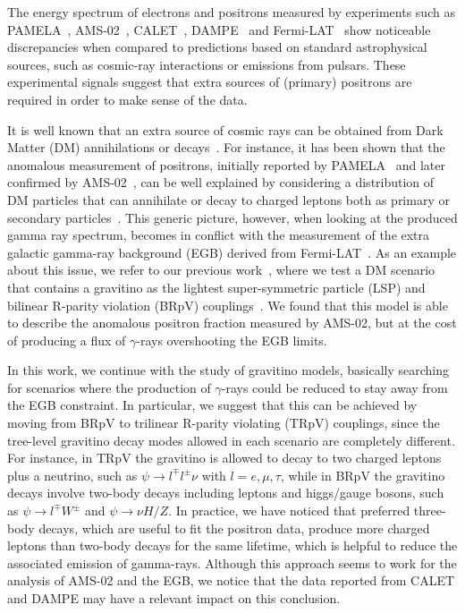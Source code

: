 \documentclass[a4paper,11pt]{article}
\begin{document}
The energy spectrum of electrons and positrons measured by experiments such as PAMELA~\cite{Adriani:2008zr}, AMS-02~\cite{Accardo:2014lma,Aguilar:2014mma,Aguilar:2014fea}, CALET~\cite{Adriani:2018ktz}, DAMPE~\cite{Ambrosi:2017wek} and Fermi-LAT~\cite{Ackermann:2014usa} show noticeable discrepancies when compared to predictions based on standard astrophysical sources, such as cosmic-ray interactions or emissions from pulsars. These experimental signals suggest that extra sources of (primary) positrons are required in order to make sense of the data. 

It is well known that an extra source  of cosmic rays can be obtained from Dark Matter (DM) annihilations or decays~\cite{Hooper:2018kfv}. For instance, it has been shown that the anomalous measurement of positrons, initially reported by PAMELA~\cite{Adriani:2008zr} and later confirmed by AMS-02~\cite{Accardo:2014lma}, can be well explained by considering a distribution of DM particles that can annihilate or decay to charged leptons both as primary or secondary particles~\cite{Grefe:2008zz,2012PhRvD..86h3506C,Ando:2015qda,Laletin:2016egv,Liu:2016ngs,Belotsky:2016tja}. This generic picture, however, when looking at the produced gamma ray spectrum, becomes in conflict with the measurement of the extra galactic gamma-ray background (EGB) derived from Fermi-LAT~\cite{Ackermann:2014usa}. As an example about this issue, we refer to our previous work~\cite{Carquin:2015uma}, where we test a DM scenario that contains a gravitino as the lightest super-symmetric particle (LSP) and bilinear R-parity violation (BRpV) couplings~\cite{Grefe:2011dp}. We found that this model is able to describe the anomalous positron fraction measured by AMS-02, but at the cost of producing a flux of $\gamma$-rays overshooting the EGB limits. 

In this work, we continue with the study of gravitino models, basically searching for scenarios where the production of $\gamma$-rays could be reduced to stay away from the EGB constraint. In particular, we suggest that this can be achieved by moving from BRpV to trilinear R-parity violating (TRpV) couplings, since the tree-level gravitino decay modes allowed in each scenario are completely different. For instance, in TRpV the gravitino is allowed to decay to two charged leptons plus a neutrino, such as $\psi \rightarrow l^{\mp}l^{\pm}\nu$ with $l=e,\mu,\tau$, while in BRpV the gravitino decays involve two-body decays including leptons and higgs/gauge bosons, such as $\psi \rightarrow l^{\mp} W^{\pm}$ and $\psi \rightarrow \nu H/Z$. In practice, we have noticed that preferred three-body decays, which are useful to fit the positron data, produce more charged leptons than  two-body decays for the same lifetime, which is helpful to reduce the associated emission of gamma-rays. Although this approach seems to work for the analysis of AMS-02 and the EGB, we notice that the data reported from CALET and DAMPE may have a relevant impact on this conclusion.
\end{document}
